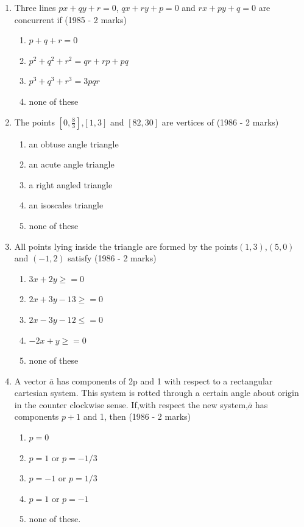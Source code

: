 \documentclass[12pt]{article}
\begin{document}
\begin{enumerate}
\item Three lines $px+qy+r=0$, $qx+ry+p=0$ and $rx+py+q=0$ are concurrent if  (1985 - 2 marks)\\
\begin{enumerate}
\item $p+q+r=0$
\item $p^2+q^2+r^2=qr+rp+pq$
\item $p^3+q^3+r^3=3pqr$
\item none of these
\end{enumerate}
\item The points $[0,\frac{8}{3}]$,$[1,3]$ and $[82,30]$ are vertices of (1986 - 2 marks)\\
\begin{enumerate}
\item an obtuse angle triangle
\item an acute angle triangle 
\item a  right angled triangle
\item an isoscales triangle
\item none of these
\end{enumerate}
\item All points lying inside the triangle are formed by the points$(1,3)$,$(5,0)$ and $(-1,2)$ satisfy (1986 - 2 marks)\\
\begin{enumerate}
\item $3x+2y\ge=0$
\item $2x+3y-13\ge=0$
\item $2x-3y-12\le=0$
\item $-2x+y\ge=0$
\item none of these
\end{enumerate}
\item A vector $\bar{a}$ has components of 2p and 1 with respect to a rectangular cartesian system. This system is rotted through a certain angle about origin in the counter clockwise sense. If,with respect the new system,$\bar{a}$ has components $p+1$ and 1, then (1986 - 2 marks)\\
\begin{enumerate}
\item $p=0$  
\item $p=1$ or  $p=-1/3$  
\item $p=-1$ or $p=1/3$ 
\item $p=1$ or  $p=-1$
\item none of these.
\end{enumerate}

\end{enumerate}
\end{document}
